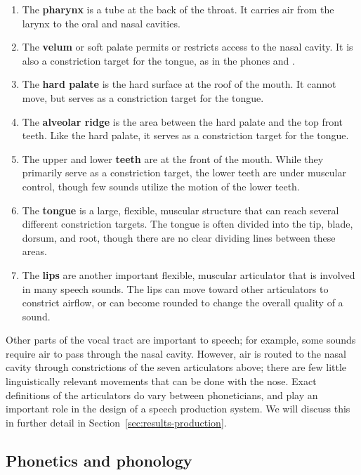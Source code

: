 \begin{enumerate}
\item The \textbf{pharynx} is a tube at the back of the throat.
  It carries air from the larynx to the oral and nasal cavities.
\item The \textbf{velum} or soft palate permits or restricts
  access to the nasal cavity. It is also a constriction target
  for the tongue, as in the phones \ipa{[k]} and \ipa{[g]}.
\item The \textbf{hard palate} is the hard surface
  at the roof of the mouth. It cannot move, but serves
  as a constriction target for the tongue.
\item The \textbf{alveolar ridge} is the area between
  the hard palate and the top front teeth. Like the hard palate,
  it serves as a constriction target for the tongue.
\item The upper and lower \textbf{teeth} are at the front of the mouth.
  While they primarily serve as a constriction target,
  the lower teeth are under muscular control,
  though few sounds utilize the motion of the lower teeth.
\item The \textbf{tongue} is a large, flexible, muscular structure
  that can reach several different constriction targets.
  The tongue is often divided into the tip, blade, dorsum, and root,
  though there are no clear dividing lines between these areas.
\item The \textbf{lips} are another important flexible, muscular
  articulator that is involved in many speech sounds.
  The lips can move toward other articulators to constrict airflow,
  or can become rounded to change the overall quality of a sound.
\end{enumerate}

Other parts of the vocal tract are important to speech;
for example, some sounds require air
to pass through the nasal cavity.
However, air is routed to the nasal cavity
through constrictions of the seven articulators above;
there are few little linguistically relevant
movements that can be done with the nose.
Exact definitions of the articulators
do vary between phoneticians,
and play an important role
in the design of a speech production system.
We will discuss this in further detail
in Section~\ref{sec:results-production}.

\subsection{Phonetics and phonology}
\label{sec:phonology}

